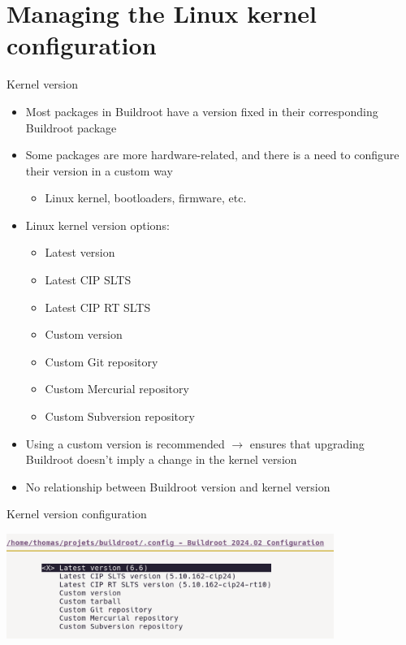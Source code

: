 \section{Managing the Linux kernel configuration}

\begin{frame}{Kernel version}
  \begin{itemize}
  \item Most packages in Buildroot have a version fixed in their
    corresponding Buildroot package
  \item Some packages are more hardware-related, and there is a need
    to configure their version in a custom way
    \begin{itemize}
    \item Linux kernel, bootloaders, firmware, etc.
    \end{itemize}
  \item Linux kernel version options:
    \begin{itemize}
    \item Latest version
    \item Latest CIP SLTS
    \item Latest CIP RT SLTS
    \item Custom version
    \item Custom Git repository
    \item Custom Mercurial repository
    \item Custom Subversion repository
    \end{itemize}
  \item Using a custom version is recommended $\rightarrow$ ensures
    that upgrading Buildroot doesn't imply a change in the kernel
    version
  \item No relationship between Buildroot version and kernel version
  \end{itemize}
\end{frame}

\begin{frame}{Kernel version configuration}
  \begin{center}
    \includegraphics[width=0.8\textwidth]{slides/buildroot-kernel/kernel-version.png}
  \end{center}
\end{frame}

